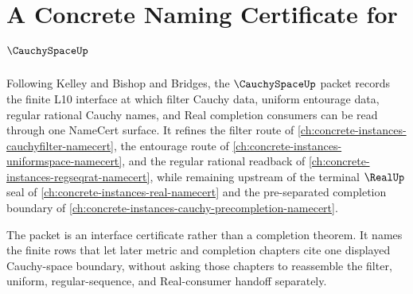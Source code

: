 \chapter{A Concrete Naming Certificate for $\CauchySpaceUp$}
\label{ch:concrete-instances-cauchyspace-namecert}

Following Kelley and Bishop and Bridges, the $\CauchySpaceUp$ packet records the finite L10 interface at which filter Cauchy data, uniform entourage data, regular rational Cauchy names, and Real completion consumers can be read through one NameCert surface. It refines the filter route of \autoref{ch:concrete-instances-cauchyfilter-namecert}, the entourage route of \autoref{ch:concrete-instances-uniformspace-namecert}, and the regular rational readback of \autoref{ch:concrete-instances-regseqrat-namecert}, while remaining upstream of the terminal $\RealUp$ seal of \autoref{ch:concrete-instances-real-namecert} and the pre-separated completion boundary of \autoref{ch:concrete-instances-cauchy-precompletion-namecert}.

The packet is an interface certificate rather than a completion theorem. It names the finite rows that let later metric and completion chapters cite one displayed Cauchy-space boundary, without asking those chapters to reassemble the filter, uniform, regular-sequence, and Real-consumer handoff separately.

